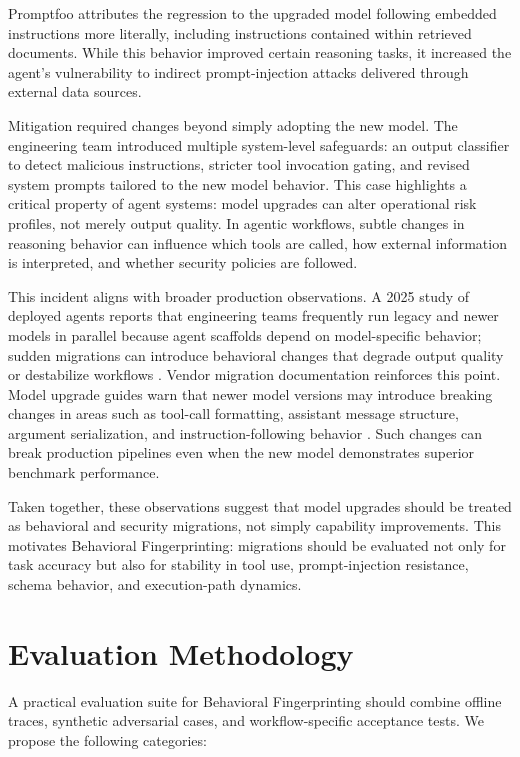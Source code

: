 \documentclass[11pt]{article}
\begin{document}
Promptfoo attributes the regression to the upgraded model following embedded instructions more literally, including instructions contained within retrieved documents. While this behavior improved certain reasoning tasks, it increased the agent's vulnerability to indirect prompt-injection attacks delivered through external data sources.

Mitigation required changes beyond simply adopting the new model. The engineering team introduced multiple system-level safeguards: an output classifier to detect malicious instructions, stricter tool invocation gating, and revised system prompts tailored to the new model behavior. This case highlights a critical property of agent systems: model upgrades can alter operational risk profiles, not merely output quality. In agentic workflows, subtle changes in reasoning behavior can influence which tools are called, how external information is interpreted, and whether security policies are followed.

This incident aligns with broader production observations. A 2025 study of deployed agents reports that engineering teams frequently run legacy and newer models in parallel because agent scaffolds depend on model-specific behavior; sudden migrations can introduce behavioral changes that degrade output quality or destabilize workflows \cite{productionagents2025}. Vendor migration documentation reinforces this point. Model upgrade guides warn that newer model versions may introduce breaking changes in areas such as tool-call formatting, assistant message structure, argument serialization, and instruction-following behavior \cite{anthropicmigration2026}. Such changes can break production pipelines even when the new model demonstrates superior benchmark performance.

Taken together, these observations suggest that model upgrades should be treated as behavioral and security migrations, not simply capability improvements. This motivates Behavioral Fingerprinting: migrations should be evaluated not only for task accuracy but also for stability in tool use, prompt-injection resistance, schema behavior, and execution-path dynamics.

\section{Evaluation Methodology}
A practical evaluation suite for Behavioral Fingerprinting should combine offline traces, synthetic adversarial cases, and workflow-specific acceptance tests. We propose the following categories:
\end{document}
